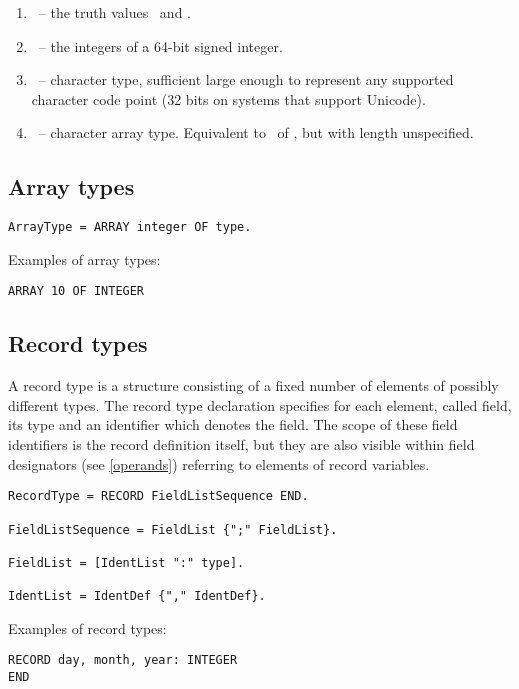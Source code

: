 \documentclass[12pt]{article}
\begin{document}
\begin{enumerate}
    \item \BOOLEAN\ -- the truth values \TRUE\ and \FALSE.
    \item \INTEGER\ -- the integers of a 64-bit signed integer.
    \item \CHAR\ -- character type, sufficient large enough to represent any supported character code point (32 bits on systems that support Unicode).
    \item \STRING\ -- character array type. Equivalent to \ARRAY\ of \CHAR, but with length unspecified.
\end{enumerate}

\subsection{Array types}

\begin{lstlisting}[style=ebnf]
ArrayType = ARRAY integer OF type. 
\end{lstlisting}

Examples of array types:
\begin{lstlisting}[style=example]
ARRAY 10 OF INTEGER 
\end{lstlisting}

\subsection{Record types}
\label{records}
A record type is a structure consisting of a fixed number of elements of possibly different types. The record type declaration specifies for each element, called field, its type and an identifier which denotes the field. The scope of these field identifiers is the record definition itself, but they are also visible within field designators (see \ref{operands}) referring to elements of record variables.

\begin{lstlisting}[style=ebnf]
RecordType = RECORD FieldListSequence END.

FieldListSequence = FieldList {";" FieldList}.

FieldList = [IdentList ":" type].

IdentList = IdentDef {"," IdentDef}.
\end{lstlisting}

Examples of record types:
\begin{lstlisting}[style=example]
RECORD day, month, year: INTEGER 
END
\end{lstlisting}
\end{document}
